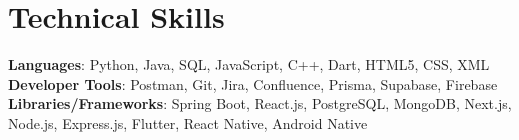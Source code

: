 \documentclass[letterpaper,11pt]{article}
\begin{document}
\section{Technical Skills}
 \begin{itemize}[leftmargin=0.15in, label={}]
    \small{\item{   
     \textbf{Languages}{: Python, Java, SQL, JavaScript, C++, Dart, HTML5, CSS, XML} \\[1mm]
     \textbf{Developer Tools}{: Postman, Git, Jira, Confluence, Prisma, Supabase, Firebase} \\[1mm]
     \textbf{Libraries/Frameworks}{: Spring Boot, React.js, PostgreSQL, MongoDB, Next.js, Node.js, Express.js, Flutter, React Native, Android Native} \\ [1mm]
    }}
 \end{itemize}
 \vspace{-16pt}
 \vspace{3pt}
\vspace{10pt}

\vspace{-15pt}
\end{document}
